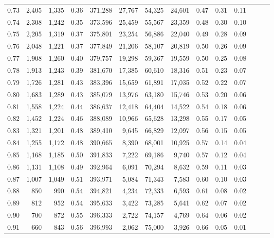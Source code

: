 \begin{tabular}{rrrrrrrrrrrrrr}
0.73 &  2,405 &  1,335 &  0.36 &  371,288 &   27,767 &  54,325 &  24,601 &  0.47 &  0.31 &      0.11 \\
0.74 &  2,308 &  1,242 &  0.35 &  373,596 &   25,459 &  55,567 &  23,359 &  0.48 &  0.30 &      0.10 \\
0.75 &  2,205 &  1,319 &  0.37 &  375,801 &   23,254 &  56,886 &  22,040 &  0.49 &  0.28 &      0.09 \\
0.76 &  2,048 &  1,221 &  0.37 &  377,849 &   21,206 &  58,107 &  20,819 &  0.50 &  0.26 &      0.09 \\
0.77 &  1,908 &  1,260 &  0.40 &  379,757 &   19,298 &  59,367 &  19,559 &  0.50 &  0.25 &      0.08 \\
0.78 &  1,913 &  1,243 &  0.39 &  381,670 &   17,385 &  60,610 &  18,316 &  0.51 &  0.23 &      0.07 \\
0.79 &  1,726 &  1,281 &  0.43 &  383,396 &   15,659 &  61,891 &  17,035 &  0.52 &  0.22 &      0.07 \\
0.80 &  1,683 &  1,289 &  0.43 &  385,079 &   13,976 &  63,180 &  15,746 &  0.53 &  0.20 &      0.06 \\
0.81 &  1,558 &  1,224 &  0.44 &  386,637 &   12,418 &  64,404 &  14,522 &  0.54 &  0.18 &      0.06 \\
0.82 &  1,452 &  1,224 &  0.46 &  388,089 &   10,966 &  65,628 &  13,298 &  0.55 &  0.17 &      0.05 \\
0.83 &  1,321 &  1,201 &  0.48 &  389,410 &    9,645 &  66,829 &  12,097 &  0.56 &  0.15 &      0.05 \\
0.84 &  1,255 &  1,172 &  0.48 &  390,665 &    8,390 &  68,001 &  10,925 &  0.57 &  0.14 &      0.04 \\
0.85 &  1,168 &  1,185 &  0.50 &  391,833 &    7,222 &  69,186 &   9,740 &  0.57 &  0.12 &      0.04 \\
0.86 &  1,131 &  1,108 &  0.49 &  392,964 &    6,091 &  70,294 &   8,632 &  0.59 &  0.11 &      0.03 \\
0.87 &  1,007 &  1,049 &  0.51 &  393,971 &    5,084 &  71,343 &   7,583 &  0.60 &  0.10 &      0.03 \\
0.88 &    850 &    990 &  0.54 &  394,821 &    4,234 &  72,333 &   6,593 &  0.61 &  0.08 &      0.02 \\
0.89 &    812 &    952 &  0.54 &  395,633 &    3,422 &  73,285 &   5,641 &  0.62 &  0.07 &      0.02 \\
0.90 &    700 &    872 &  0.55 &  396,333 &    2,722 &  74,157 &   4,769 &  0.64 &  0.06 &      0.02 \\
0.91 &    660 &    843 &  0.56 &  396,993 &    2,062 &  75,000 &   3,926 &  0.66 &  0.05 &      0.01 \\

\end{tabular}

